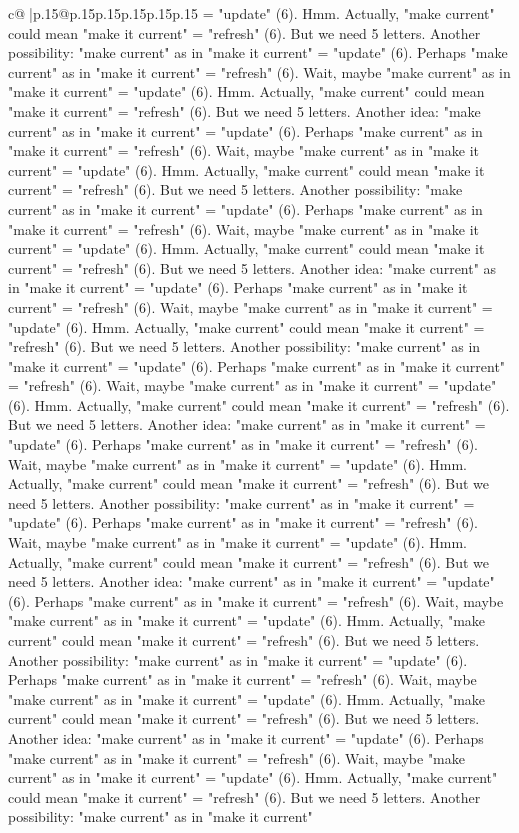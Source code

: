 \documentclass{article}
\begin{document}
{\begin{supertabular}{c@{$\;$}|p{.15\linewidth}@{}p{.15\linewidth}p{.15\linewidth}p{.15\linewidth}p{.15\linewidth}p{.15\linewidth}}
{{{= "update" (6). Hmm. Actually, "make current" could mean "make it current" = "refresh" (6). But we need 5 letters. Another possibility: "make current" as in "make it current" = "update" (6). Perhaps "make current" as in "make it current" = "refresh" (6). Wait, maybe "make current" as in "make it current" = "update" (6). Hmm. Actually, "make current" could mean "make it current" = "refresh" (6). But we need 5 letters. Another idea: "make current" as in "make it current" = "update" (6). Perhaps "make current" as in "make it current" = "refresh" (6). Wait, maybe "make current" as in "make it current" = "update" (6). Hmm. Actually, "make current" could mean "make it current" = "refresh" (6). But we need 5 letters. Another possibility: "make current" as in "make it current" = "update" (6). Perhaps "make current" as in "make it current" = "refresh" (6). Wait, maybe "make current" as in "make it current" = "update" (6). Hmm. Actually, "make current" could mean "make it current" = "refresh" (6). But we need 5 letters. Another idea: "make current" as in "make it current" = "update" (6). Perhaps "make current" as in "make it current" = "refresh" (6). Wait, maybe "make current" as in "make it current" = "update" (6). Hmm. Actually, "make current" could mean "make it current" = "refresh" (6). But we need 5 letters. Another possibility: "make current" as in "make it current" = "update" (6). Perhaps "make current" as in "make it current" = "refresh" (6). Wait, maybe "make current" as in "make it current" = "update" (6). Hmm. Actually, "make current" could mean "make it current" = "refresh" (6). But we need 5 letters. Another idea: "make current" as in "make it current" = "update" (6). Perhaps "make current" as in "make it current" = "refresh" (6). Wait, maybe "make current" as in "make it current" = "update" (6). Hmm. Actually, "make current" could mean "make it current" = "refresh" (6). But we need 5 letters. Another possibility: "make current" as in "make it current" = "update" (6). Perhaps "make current" as in "make it current" = "refresh" (6). Wait, maybe "make current" as in "make it current" = "update" (6). Hmm. Actually, "make current" could mean "make it current" = "refresh" (6). But we need 5 letters. Another idea: "make current" as in "make it current" = "update" (6). Perhaps "make current" as in "make it current" = "refresh" (6). Wait, maybe "make current" as in "make it current" = "update" (6). Hmm. Actually, "make current" could mean "make it current" = "refresh" (6). But we need 5 letters. Another possibility: "make current" as in "make it current" = "update" (6). Perhaps "make current" as in "make it current" = "refresh" (6). Wait, maybe "make current" as in "make it current" = "update" (6). Hmm. Actually, "make current" could mean "make it current" = "refresh" (6). But we need 5 letters. Another idea: "make current" as in "make it current" = "update" (6). Perhaps "make current" as in "make it current" = "refresh" (6). Wait, maybe "make current" as in "make it current" = "update" (6). Hmm. Actually, "make current" could mean "make it current" = "refresh" (6). But we need 5 letters. Another possibility: "make current" as in "make it current" }}}
\end{supertabular}}
\end{document}

